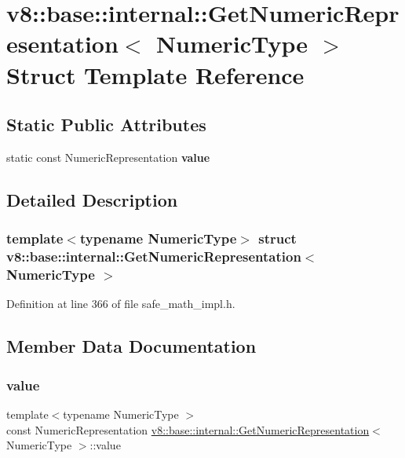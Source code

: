 \hypertarget{structv8_1_1base_1_1internal_1_1GetNumericRepresentation}{}\section{v8\+:\+:base\+:\+:internal\+:\+:Get\+Numeric\+Representation$<$ Numeric\+Type $>$ Struct Template Reference}
\label{structv8_1_1base_1_1internal_1_1GetNumericRepresentation}
\subsection*{Static Public Attributes}
\begin{DoxyCompactItemize}
\item 
static const Numeric\+Representation {\bfseries value}
\end{DoxyCompactItemize}


\subsection{Detailed Description}
\subsubsection*{template$<$typename Numeric\+Type$>$\newline
struct v8\+::base\+::internal\+::\+Get\+Numeric\+Representation$<$ Numeric\+Type $>$}



Definition at line 366 of file safe\+\_\+math\+\_\+impl.\+h.



\subsection{Member Data Documentation}
\mbox{\label{structv8_1_1base_1_1internal_1_1GetNumericRepresentation_a9c8a294e8231cc03cb6b3d7c6a93c9ba}} 
\subsubsection{\texorpdfstring{value}{value}}
{\footnotesize\ttfamily template$<$typename Numeric\+Type $>$ \\
const Numeric\+Representation \mbox{\hyperlink{structv8_1_1base_1_1internal_1_1GetNumericRepresentation}{v8\+::base\+::internal\+::\+Get\+Numeric\+Representation}}$<$ Numeric\+Type $>$\+::value\hspace{0.3cm}{\ttfamily [static]}}

